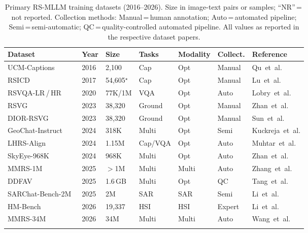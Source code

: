 \begin{table}[t]
\caption{Primary RS-MLLM training datasets (2016--2026). Size in image-text
pairs or samples; ``NR''\,=\,not reported. Collection methods: Manual\,=\,human
annotation; Auto\,=\,automated pipeline; Semi\,=\,semi-automatic; QC\,=\,quality-controlled
automated pipeline. All values as reported in the respective dataset
papers.}\label{tab:datasets}
\tiny\setlength\tabcolsep{2pt}
\begin{tabular*}{\textwidth}{@{\extracolsep\fill}p{2.0cm}lp{0.9cm}p{1.4cm}lp{0.9cm}p{1.8cm}}
\toprule
\textbf{Dataset} & \textbf{Year} & \textbf{Size} &
\textbf{Tasks} & \textbf{Modality} &
\textbf{Collect.} & \textbf{Reference} \\
\midrule
UCM-Captions~\cite{ucmcaptions2016,sydneycaptions2017}
  & 2016 & 2,100 & Cap & Opt & Manual
  & Qu~et~al. \\
RSICD~\cite{rsicd2017}
  & 2017 & 54,605$^\star$ & Cap & Opt & Manual
  & Lu~et~al. \\
RSVQA-LR\,/\,HR~\cite{rsvqa2020}
  & 2020 & 77K/1M & VQA & Opt & Auto
  & Lobry~et~al. \\
RSVG~\cite{rsvg2023}
  & 2023 & 38,320 & Ground & Opt & Manual
  & Zhan~et~al. \\
DIOR-RSVG~\cite{diorrsvg2023}
  & 2023 & 38,320 & Ground & Opt & Manual
  & Sun~et~al. \\
GeoChat-Instruct~\cite{geochat2024}
  & 2024 & 318K & Multi & Opt & Semi
  & Kuckreja~et~al. \\
LHRS-Align~\cite{lhrsalign2024}
  & 2024 & 1.15M & Cap/VQA & Opt & Auto
  & Muhtar~et~al. \\
SkyEye-968K~\cite{skyeyegpt2025}
  & 2024 & 968K & Multi & Opt & Auto
  & Zhan~et~al. \\
MMRS-1M~\cite{mmrs1m2025}
  & 2025 & $>$1M & Multi & Multi & Auto
  & Zhang~et~al. \\
DDFAV~\cite{ddfav2025}
  & 2025 & 1.6\,GB & Multi & Opt & QC
  & Tang~et~al. \\
SARChat-Bench-2M~\cite{sarchatchat2025}
  & 2025 & 2M & SAR & SAR & Semi
  & Li~et~al. \\
HM-Bench~\cite{hmbench2026}
  & 2026 & 19,337 & HSI & HSI & Expert
  & Li~et~al. \\
MMRS-34M~\cite{mmrs34m2026}
  & 2026 & 34M & Multi & Multi & Auto
  & Wang~et~al. \\
\botrule
\end{tabular*}
\end{table}

